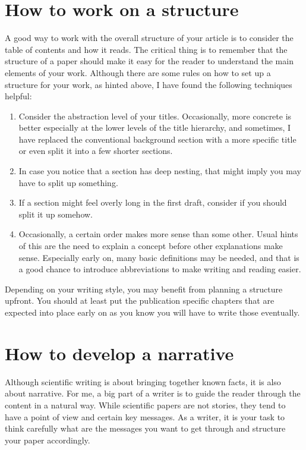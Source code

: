 \section{How to work on a structure}

A good way to work with the overall structure of your article is to consider the table of contents and how it reads.
The critical thing is to remember that the structure of a paper should make it easy for the reader to understand the main elements of your work.
Although there are some rules on how to set up a structure for your work, as hinted above, I have found the following techniques helpful:

\begin{enumerate}
    \item Consider the abstraction level of your titles. Occasionally, more concrete is better especially at the lower levels of the title hierarchy, and sometimes, I have replaced the conventional background section with a more specific title or even split it into a few shorter sections.
    \item In case you notice that a section has deep nesting, that might imply you may have to split up something.
    \item If a section might feel overly long in the first draft, consider if you should split it up somehow.
    \item Occasionally, a certain order makes more sense than some other. Usual hints of this are the need to explain a concept before other explanations make sense. Especially early on, many basic definitions may be needed, and that is a good chance to introduce abbreviations to make writing and reading easier.
\end{enumerate}

Depending on your writing style, you may benefit from planning a structure upfront.
You should at least put the publication specific chapters that are expected into place early on as you know you will have to write those eventually.

\section{How to develop a narrative}

Although scientific writing is about bringing together known facts, it is also about narrative.
For me, a big part of a writer is to guide the reader through the content in a natural way. While scientific papers are not stories, they tend to have a point of view and certain key messages.
As a writer, it is your task to think carefully what are the messages you want to get through and structure your paper accordingly.

